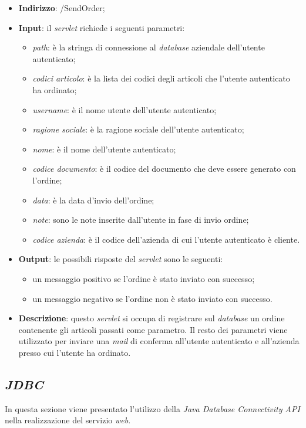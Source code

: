 \begin{itemize}
	\item \textbf{Indirizzo}: /SendOrder;
	\item \textbf{Input}: il \textit{servlet} richiede i seguenti parametri:
		\begin{itemize}
			\item \textit{path}: è la stringa di connessione al \textit{database} aziendale dell'utente autenticato;
			\item \textit{codici articolo}: è la lista dei codici degli articoli che l'utente autenticato ha ordinato;
			\item \textit{username}: è il nome utente dell'utente autenticato;
			\item \textit{ragione sociale}: è la ragione sociale dell'utente autenticato;
			\item \textit{nome}: è il nome dell'utente autenticato;
			\item \textit{codice documento}: è il codice del documento che deve essere generato con l'ordine;
			\item \textit{data}: è la data d'invio dell'ordine;
			\item \textit{note}: sono le note inserite dall'utente in fase di invio ordine;
			\item \textit{codice azienda}: è il codice dell'azienda di cui l'utente autenticato è cliente.
		\end{itemize}
	\item \textbf{Output}: le possibili risposte del \textit{servlet} sono le seguenti:
		\begin{itemize}
			\item un messaggio positivo se l'ordine è stato inviato con successo;
			\item un messaggio negativo se l'ordine non è stato inviato con successo.
		\end{itemize}
	\item \textbf{Descrizione}: questo \textit{servlet} si occupa di registrare sul \textit{database} un ordine contenente gli articoli passati come parametro. Il resto dei parametri viene utilizzato per inviare una \textit{mail} di conferma all'utente autenticato e all'azienda presso cui l'utente ha ordinato.
\end{itemize}
\newpage
\subsection{\textit{JDBC}}

In questa sezione viene presentato l'utilizzo della \textit{Java Database Connectivity API} nella realizzazione del servizio \textit{web}.

